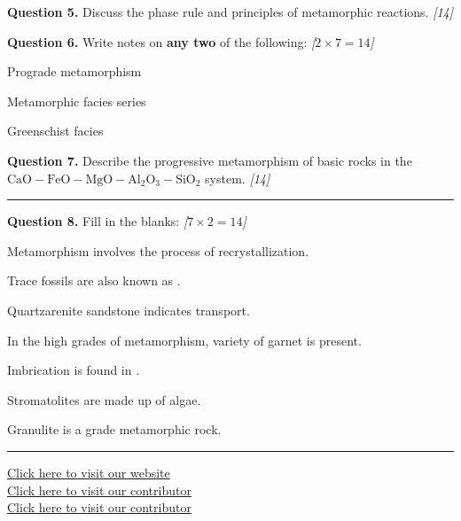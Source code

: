 \documentclass[11pt,a4paper]{article}
\newcommand{\pts}[1]{\hfill   \textit{[#1]}}
\begin{document}
\noindent   \textbf{Question 5.} Discuss the phase rule and principles of metamorphic reactions. \pts{14}

\medskip


\noindent   \textbf{Question 6.} Write notes on   \textbf{any two} of the following: \pts{$2  \times 7 = 14$}

\begin{parts}
  \item Prograde metamorphism
  \item Metamorphic facies series
  \item Greenschist facies
\end{parts}

\medskip


\noindent   \textbf{Question 7.} Describe the progressive metamorphism of basic rocks in the $ \text{CaO}- \text{FeO}- \text{MgO}- \text{Al}_2 \text{O}_3- \text{SiO}_2$ system. \pts{14}

\bigskip


\rule{\linewidth}{0.4pt}\smallskip




\noindent   \textbf{Question 8.} Fill in the blanks: \pts{$7  \times 2 = 14$}

\begin{parts}
  \item Metamorphism involves the process of \underline{\hspace{4cm}} recrystallization.
  \item Trace fossils are also known as \underline{\hspace{4cm}}.
  \item Quartzarenite sandstone indicates \underline{\hspace{4cm}} transport.
  \item In the high grades of metamorphism, \underline{\hspace{4cm}} variety of garnet is present.
  \item Imbrication is found in \underline{\hspace{4cm}}.
  \item Stromatolites are made up of \underline{\hspace{4cm}} algae.
  \item Granulite is a \underline{\hspace{4cm}} grade metamorphic rock.
\end{parts}

\vfill\rule{\linewidth}{0.4pt}

\begin{center}\small
\href{https://bhu-exam.vercel.app/}{Click here to visit our website}\\[4pt]
\href{https://me-aryan.vercel.app/}{Click here to visit our contributor}\\[4pt]
\href{https://quashan-me.vercel.app/}{Click here to visit our contributor}
\end{center}
\end{document}
